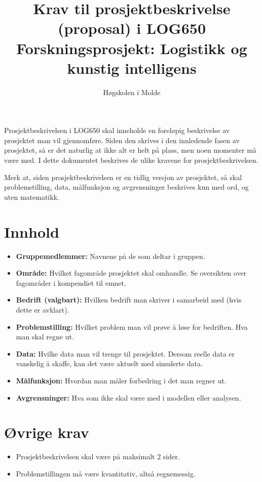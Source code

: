 \documentclass[a4paper,12pt]{article}
\title{Krav til prosjektbeskrivelse (proposal) i LOG650\\Forskningsprosjekt: Logistikk og kunstig intelligens}
\date{}
\author{Høgskolen i Molde}
\begin{document}
\maketitle

Prosjektbeskrivelsen i LOG650 skal inneholde en foreløpig beskrivelse av prosjektet man vil gjennomføre. Siden den skrives i den innledende fasen av prosjektet, så er det naturlig at ikke alt er helt på plass, men noen momenter må være med. I dette dokumentet beskrives de ulike kravene for prosjektbeskrivelsen.

Merk at, siden prosjektbeskrivelsen er en tidlig versjon av prosjektet, så skal problemstilling, data, målfunksjon og avgrensninger beskrives kun med ord, og uten matematikk.

\section*{Innhold}

\begin{itemize}
    \item \textbf{Gruppemedlemmer:} Navnene på de som deltar i gruppen.
    \item \textbf{Område:} Hvilket fagområde prosjektet skal omhandle. Se oversikten over fagområder i kompendiet til emnet.
    \item \textbf{Bedrift (valgbart):} Hvilken bedrift man skriver i samarbeid med (hvis dette er avklart).
    \item \textbf{Problemstilling:} Hvilket problem man vil prøve å løse for bedriften. Hva man skal regne ut.
    \item \textbf{Data:} Hvilke data man vil trenge til prosjektet. Dersom reelle data er vanskelig å skaffe, kan det være aktuelt med simulerte data.
    \item \textbf{Målfunksjon:} Hvordan man måler forbedring i det man regner ut.
    \item \textbf{Avgrensninger:} Hva som ikke skal være med i modellen eller analysen.
\end{itemize}

\section*{Øvrige krav}

\begin{itemize}
    \item Prosjektbeskrivelsen skal være på maksimalt 2 sider.
    \item Problemstillingen må være kvantitativ, altså regnemessig.
\end{itemize}
\end{document}
